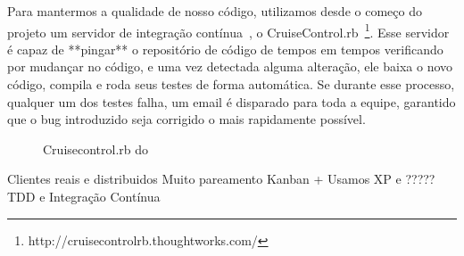 Para mantermos a qualidade de nosso código, utilizamos desde o começo do projeto um servidor de integração contínua~\cite{ci}, o CruiseControl.rb~\footnote{http://cruisecontrolrb.thoughtworks.com/}. Esse servidor é capaz de **pingar** o repositório de código de tempos em tempos verificando por mudançar no código, e uma vez detectada alguma alteração, ele baixa o novo código, compila e roda seus testes de forma automática. Se durante esse processo, qualquer um dos testes falha, um email é disparado para toda a equipe, garantido que o bug introduzido seja corrigido o mais rapidamente possível.

\begin{figure}[H]
  \centering
  \caption{Cruisecontrol.rb do \calopsita}
\end{figure}

Clientes reais e distribuidos
Muito pareamento
Kanban + \calopsita
Usamos XP e ?????
TDD e Integração Contínua

